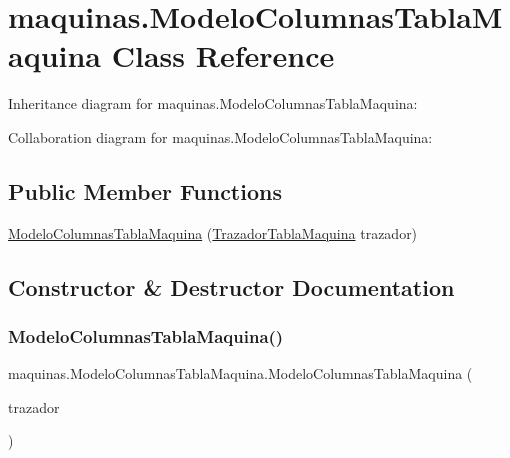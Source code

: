 \hypertarget{classmaquinas_1_1_modelo_columnas_tabla_maquina}{}\section{maquinas.\+Modelo\+Columnas\+Tabla\+Maquina Class Reference}
\label{classmaquinas_1_1_modelo_columnas_tabla_maquina}


Inheritance diagram for maquinas.\+Modelo\+Columnas\+Tabla\+Maquina\+:


Collaboration diagram for maquinas.\+Modelo\+Columnas\+Tabla\+Maquina\+:
\subsection*{Public Member Functions}
\begin{DoxyCompactItemize}
\item 
\mbox{\hyperlink{classmaquinas_1_1_modelo_columnas_tabla_maquina_aa6c7c956069c990f37b1867decb1581b}{Modelo\+Columnas\+Tabla\+Maquina}} (\mbox{\hyperlink{classmaquinas_1_1_trazador_tabla_maquina}{Trazador\+Tabla\+Maquina}} trazador)
\end{DoxyCompactItemize}


\subsection{Constructor \& Destructor Documentation}
\mbox{\label{classmaquinas_1_1_modelo_columnas_tabla_maquina_aa6c7c956069c990f37b1867decb1581b}} 
\subsubsection{\texorpdfstring{Modelo\+Columnas\+Tabla\+Maquina()}{ModeloColumnasTablaMaquina()}}
{\footnotesize\ttfamily maquinas.\+Modelo\+Columnas\+Tabla\+Maquina.\+Modelo\+Columnas\+Tabla\+Maquina (\begin{DoxyParamCaption}\item[{\mbox{\hyperlink{classmaquinas_1_1_trazador_tabla_maquina}{Trazador\+Tabla\+Maquina}}}]{trazador }\end{DoxyParamCaption})\hspace{0.3cm}{\ttfamily [inline]}}


